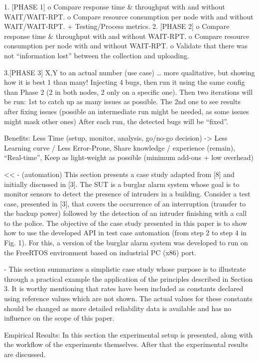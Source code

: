 \documentclass[runningheads,a4paper]{llncs}
\begin{document}
1.	[PHASE 1]
o	Compare response time \& throughput with and without WAIT/WAIT-RPT.
o	Compare resource consumption per node with and without WAIT/WAIT-RPT.
+ Testing/Process metrics.
2.	[PHASE 2]
o	Compare response time \& throughput with and without WAIT-RPT.
o	Compare resource consumption per node with and without WAIT-RPT.
o	Validate that there was not “information lost” between the collection and uploading.

3.[PHASE 3]
X,Y to an actual number (use case) … more qualitative, but showing how it is best 1 than many!
Injecting 4 bugs, then run it using the same config than Phase 2 (2 in both nodes, 2 only on a specific one). Then two iterations will be run: 1st to catch up as many issues as possible. The 2nd one to see results after fixing issues (possible an intermediate run might be needed, as some issues might mask other ones) After each run, the detected bugs will be “fixed”.

Benefits: Less Time (setup, monitor, analysis, go/no-go decision) -> Less
Learning curve / Less Error-Prone, Share knowledge / experience (remain), “Real-time”, Keep as light-weight as possible (minimum add-ons + low overhead)

<<
- (automation) This section presents a case study adapted from [8] and initially discussed 
in [3]. The SUT is a burglar alarm system whose goal is to monitor sensors to detect
the presence of intruders in a building. Consider a test case, presented in [3],
that covers the occurrence of an interruption (transfer to the backup power)
followed by the detection of an intruder finishing with a call to the police. The
objective of the case study presented in this paper is to show how to use the
developed API in test case automation (from step 2 to step 4 in Fig. 1). For this,
a version of the burglar alarm system was developed to run on the FreeRTOS
environment based on industrial PC (x86) port.

- This section summarizes a simplistic case study whose purpose is to illustrate
through a practical example the application of the principles described in Section 3. It
is worthy mentioning that rates have been included as constants declared using
reference values which are not shown. The actual values for these constants should be
changed as more detailed reliability data is available and has no influence on the
scope of this paper.

Empirical Results: In this section the experimental setup is presented, along with the workflow of
the experiments themselves. After that the experimental results are discussed.
\end{document}
